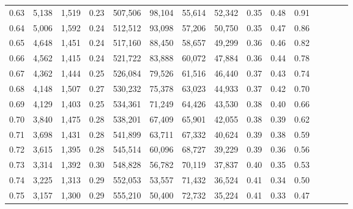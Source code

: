 \begin{tabular}{rrrcrrrrrrrrrrr}
0.63 &   5,138 &   1,519 &                                       0.23 &  507,506 &   98,104 &   55,614 &   52,342 &  0.35 &  0.48 &                         0.91 \\
0.64 &   5,006 &   1,592 &                                       0.24 &  512,512 &   93,098 &   57,206 &   50,750 &  0.35 &  0.47 &                         0.86 \\
0.65 &   4,648 &   1,451 &                                       0.24 &  517,160 &   88,450 &   58,657 &   49,299 &  0.36 &  0.46 &                         0.82 \\
0.66 &   4,562 &   1,415 &                                       0.24 &  521,722 &   83,888 &   60,072 &   47,884 &  0.36 &  0.44 &                         0.78 \\
0.67 &   4,362 &   1,444 &                                       0.25 &  526,084 &   79,526 &   61,516 &   46,440 &  0.37 &  0.43 &                         0.74 \\
0.68 &   4,148 &   1,507 &                                       0.27 &  530,232 &   75,378 &   63,023 &   44,933 &  0.37 &  0.42 &                         0.70 \\
0.69 &   4,129 &   1,403 &                                       0.25 &  534,361 &   71,249 &   64,426 &   43,530 &  0.38 &  0.40 &                         0.66 \\
0.70 &   3,840 &   1,475 &                                       0.28 &  538,201 &   67,409 &   65,901 &   42,055 &  0.38 &  0.39 &                         0.62 \\
0.71 &   3,698 &   1,431 &                                       0.28 &  541,899 &   63,711 &   67,332 &   40,624 &  0.39 &  0.38 &                         0.59 \\
0.72 &   3,615 &   1,395 &                                       0.28 &  545,514 &   60,096 &   68,727 &   39,229 &  0.39 &  0.36 &                         0.56 \\
0.73 &   3,314 &   1,392 &                                       0.30 &  548,828 &   56,782 &   70,119 &   37,837 &  0.40 &  0.35 &                         0.53 \\
0.74 &   3,225 &   1,313 &                                       0.29 &  552,053 &   53,557 &   71,432 &   36,524 &  0.41 &  0.34 &                         0.50 \\
0.75 &   3,157 &   1,300 &                                       0.29 &  555,210 &   50,400 &   72,732 &   35,224 &  0.41 &  0.33 &                         0.47 \\

\end{tabular}
